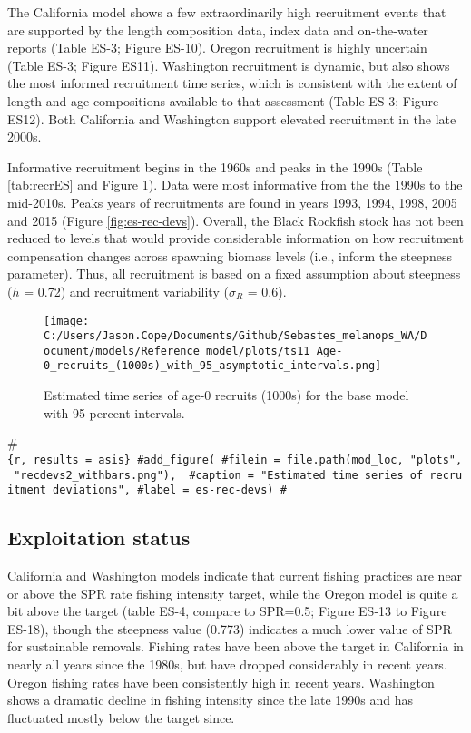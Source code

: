 \documentclass[11pt,
  english,
  letterpaper,
]{article}
\begin{document}
The California model shows a few extraordinarily high recruitment events that are supported by the length composition data, index data and on-the-water reports (Table ES-3; Figure ES-10). Oregon recruitment is highly uncertain (Table ES-3; Figure ES11). Washington recruitment is dynamic, but also shows the most informed recruitment time series, which is consistent with the extent of length and age compositions available to that assessment (Table ES-3; Figure ES12). Both California and Washington support elevated recruitment in the late 2000s.

Informative recruitment begins in the 1960s and peaks in the 1990s (Table \ref{tab:recrES} and Figure \ref{fig:es-recruits}). Data were most informative from the the 1990s to the mid-2010s. Peaks years of recruitments are found in years 1993, 1994, 1998, 2005 and 2015 (Figure \ref{fig:es-rec-devs}). Overall, the Black Rockfish stock has not been reduced to levels that would provide considerable information on how recruitment compensation changes across spawning biomass levels (i.e., inform the steepness parameter). Thus, all recruitment is based on a fixed assumption about steepness (\(h\) = 0.72) and recruitment variability (\(\sigma_R\) = 0.6).



\begin{figure}
\centering
\texttt{[image: C:/Users/Jason.Cope/Documents/Github/Sebastes\_melanops\_WA/Document/models/Reference model/plots/ts11\_Age-0\_recruits\_(1000s)\_with\_95\_asymptotic\_intervals.png]}
\caption{Estimated time series of age-0 recruits (1000s) for the base model with 95 percent intervals.\label{fig:es-recruits}}
\end{figure}

\#\texttt{\{r,\ results\ =\ \textquotesingle{}asis\textquotesingle{}\}\ \#add\_figure(\ \#filein\ =\ file.path(mod\_loc,\ "plots",\ "recdevs2\_withbars.png"),\ \ \#caption\ =\ "Estimated\ time\ series\ of\ recruitment\ deviations",\ \#label\ =\ \textquotesingle{}es-rec-devs\textquotesingle{})\ \#}

\hypertarget{exploitation-status}{%
\subsection*{Exploitation status}\label{exploitation-status}}

California and Washington models indicate that current fishing practices are near or above the SPR rate fishing intensity target, while the Oregon model is quite a bit above the target (table ES-4, compare to SPR=0.5; Figure ES-13 to Figure ES-18), though the steepness value (0.773) indicates a much lower value of SPR for sustainable removals. Fishing rates have been above the target in California in nearly all years since the 1980s, but have dropped considerably in recent years. Oregon fishing rates have been consistently high in recent years. Washington shows a dramatic decline in fishing intensity since the late 1990s and has fluctuated mostly below the target since.
\end{document}
